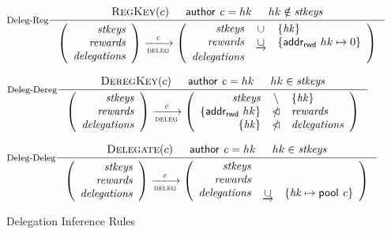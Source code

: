 \begin{figure}
  \centering
  \begin{equation}\label{eq:deleg-reg}
    \inference[Deleg-Reg]
    {
      \RegKey{c} & \cauthor{c} = hk & hk \notin \var{stkeys}
    }
    {
      \left(
      \begin{array}{r}
        \var{stkeys} \\
        \var{rewards} \\
        \var{delegations}
      \end{array}
      \right)
      \trans{deleg}{\var{c}}
      \left(
      \begin{array}{rcl}
        \var{stkeys} & \union & \{\var{hk}\}\\
        \var{rewards} & \unionoverride & \{\addrRw \var{hk} \mapsto 0\}\\
        \var{delegations}
      \end{array}
      \right)
    }
  \end{equation}

  \begin{equation}\label{eq:deleg-dereg}
    \inference[Deleg-Dereg]
    {
      \DeregKey{c} & \cauthor{c} = hk & hk \in \var{stkeys}
    }
    {
      \left(
      \begin{array}{r}
        \var{stkeys} \\
        \var{rewards} \\
        \var{delegations}
      \end{array}
      \right)
      \trans{deleg}{\var{c}}
      \left(
      \begin{array}{rcl}
        \var{stkeys} & \setminus & \{\var{hk}\}\\
        \{\addrRw \var{hk}\} & \subtractdom & \var{rewards} \\
        \{\var{hk}\} & \subtractdom & \var{delegations}
      \end{array}
      \right)
    }
  \end{equation}

  \begin{equation}\label{eq:deleg-deleg}
    \inference[Deleg-Deleg]
    {
      \Delegate{c} & \cauthor{c} = hk & hk \in \var{stkeys}
    }
    {
      \left(
      \begin{array}{r}
        \var{stkeys} \\
        \var{rewards} \\
        \var{delegations}
      \end{array}
      \right)
      \trans{deleg}{c}
      \left(
      \begin{array}{rcl}
        \var{stkeys} \\
        \var{rewards} \\
        \var{delegations} & \unionoverride & \{\var{hk} \mapsto \pool c\}
      \end{array}
      \right)
    }
  \end{equation}
  \caption{Delegation Inference Rules}
  \label{fig:delegation-rules}
\end{figure}

